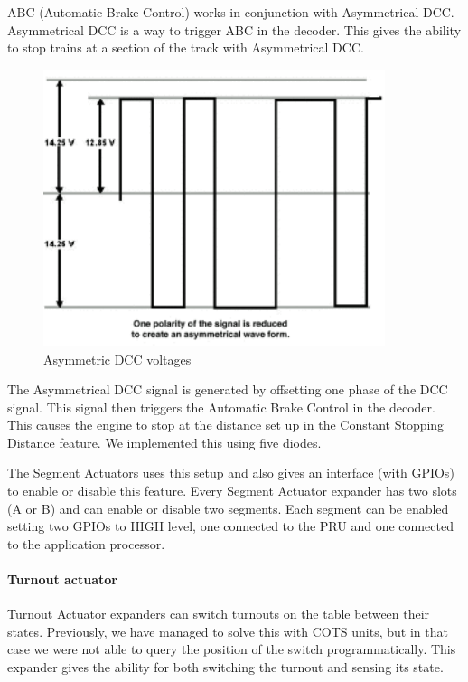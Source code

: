 ABC (Automatic Brake Control) works in conjunction with Asymmetrical DCC. Asymmetrical DCC is a way to trigger ABC in the decoder. This gives the ability to stop trains at a section of the track with Asymmetrical DCC.

\begin{figure}[!ht]
	\centering
	\includegraphics[width=100mm]{figures/modes3/DCC.png}
	\caption{Asymmetric DCC voltages}
	\label{fig:dcc}
\end{figure}

The Asymmetrical DCC signal is generated by offsetting one phase of the DCC signal. This signal then triggers the Automatic Brake Control in the decoder. This causes the engine to stop at the distance set up in the Constant Stopping Distance feature. We implemented this using five diodes. %


The Segment Actuators uses this setup and also gives an interface (with GPIOs) to enable or disable this feature. Every Segment Actuator expander has two slots (A or B) and can enable or disable two segments. Each segment can be enabled setting two GPIOs to HIGH level, one connected to the PRU and one connected to the application processor.

\paragraph{Turnout actuator}
Turnout Actuator expanders can switch turnouts on the table between their states. Previously, we have managed to solve this with COTS units, but in that case we were not able to query the position of the switch programmatically. This expander gives the ability for both switching the turnout and sensing its state.

